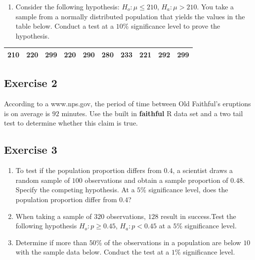 \documentclass[
  letterpaper,
  DIV=11,
  numbers=noendperiod]{scrreprt}
\providecommand{\tightlist}{%
  \setlength{\itemsep}{0pt}\setlength{\parskip}{0pt}}\usepackage{longtable,booktabs,array}
\begin{document}
\begin{enumerate}
\def\labelenumi{\arabic{enumi}.}
\setcounter{enumi}{2}
\tightlist
\item
  Consider the following hypothesis: \(H_{o}: \mu \leq 210\),
  \(H_{a}: \mu > 210\). You take a sample from a normally distributed
  population that yields the values in the table below. Conduct a test
  at a \(10\)\% significance level to prove the hypothesis.
\end{enumerate}

\begin{longtable}[]{@{}llllllllll@{}}
\toprule()
\endhead
210 & 220 & 299 & 220 & 290 & 280 & 233 & 221 & 292 & 299 \\
\bottomrule()
\end{longtable}

\hypertarget{exercise-2-24}{%
\subsection*{Exercise 2}\label{exercise-2-24}}

According to a www.nps.gov, the period of time between Old Faithful's
eruptions is on average is \(92\) minutes. Use the built in
\textbf{faithful} R data set and a two tail test to determine whether
this claim is true.

\hypertarget{exercise-3-24}{%
\subsection*{Exercise 3}\label{exercise-3-24}}

\begin{enumerate}
\def\labelenumi{\arabic{enumi}.}
\item
  To test if the population proportion differs from \(0.4\), a scientist
  draws a random sample of \(100\) observations and obtain a sample
  proportion of \(0.48\). Specify the competing hypothesis. At a \(5\)\%
  significance level, does the population proportion differ from
  \(0.4\)?
\item
  When taking a sample of \(320\) observations, \(128\) result in
  success.Test the following hypothesis \(H_{o}: p \geq 0.45\),
  \(H_{a}: p < 0.45\) at a \(5\)\% significance level.
\item
  Determine if more than \(50\)\% of the observations in a population
  are below \(10\) with the sample data below. Conduct the test at a
  \(1\)\% significance level.
\end{enumerate}
\end{document}
